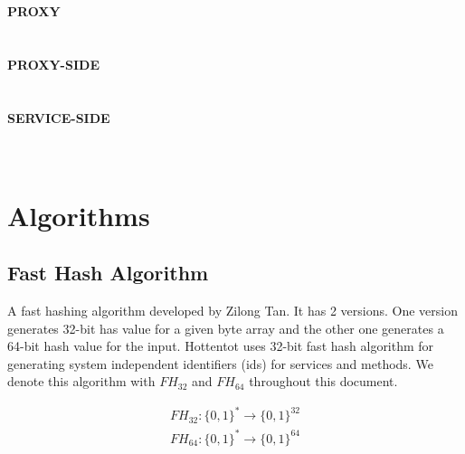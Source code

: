 \documentclass[10pt,a4paper]{article}
\begin{document}
  \textbf {PROXY} \\  \\\\
  \textbf {PROXY-SIDE} \\  \\\\
  \textbf {SERVICE-SIDE} \\  \\\\

\section {Algorithms}

\subsection {Fast Hash Algorithm}
A fast hashing algorithm developed by Zilong Tan. It has 2 versions. One version generates 32-bit has value for a given byte array and the other one generates a 64-bit hash value for the input. Hottentot uses 32-bit fast hash algorithm for generating system independent identifiers (ids) for services and methods. We denote this algorithm with $ FH_{32} $ and $ FH_{64} $ throughout this document.

\begin{equation}
\begin{split}
  FH_{32}: \{0, 1\}^* \to \{0, 1\}^{32}  \\
  FH_{64}: \{0, 1\}^* \to \{0, 1\}^{64}
\end{split}
\end{equation}
\end{document}
